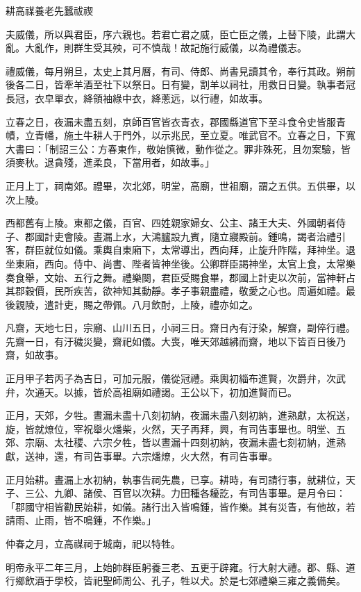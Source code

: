 
\begin{pinyinscope}
耕高禖養老先蠶祓禊

夫威儀，所以與君臣，序六親也。若君亡君之威，臣亡臣之儀，上替下陵，此謂大亂。大亂作，則群生受其殃，可不慎哉！故記施行威儀，以為禮儀志。

禮威儀，每月朔旦，太史上其月曆，有司、侍郎、尚書見讀其令，奉行其政。朔前後各二日，皆牽羊酒至社下以祭日。日有變，割羊以祠社，用救日日變。執事者冠長冠，衣皁單衣，絳領袖綠中衣，絳蔥远，以行禮，如故事。

立春之日，夜漏未盡五刻，京師百官皆衣青衣，郡國縣道官下至斗食令史皆服青幘，立青幡，施土牛耕人于門外，以示兆民，至立夏。唯武官不。立春之日，下寬大書曰：「制詔三公：方春東作，敬始慎微，動作從之。罪非殊死，且勿案驗，皆須麥秋。退貪殘，進柔良，下當用者，如故事。」

正月上丁，祠南郊。禮畢，次北郊，明堂，高廟，世祖廟，謂之五供。五供畢，以次上陵。

西都舊有上陵。東都之儀，百官、四姓親家婦女、公主、諸王大夫、外國朝者侍子、郡國計吏會陵。晝漏上水，大鴻臚設九賓，隨立寢殿前。鍾鳴，謁者治禮引客，群臣就位如儀。乘輿自東廂下，太常導出，西向拜，止旋升阼階，拜神坐。退坐東廂，西向。侍中、尚書、陛者皆神坐後。公卿群臣謁神坐，太官上食，太常樂奏食舉，文始、五行之舞。禮樂闋，君臣受賜食畢，郡國上計吏以次前，當神軒占其郡穀價，民所疾苦，欲神知其動靜。孝子事親盡禮，敬愛之心也。周遍如禮。最後親陵，遣計吏，賜之帶佩。八月飲酎，上陵，禮亦如之。

凡齋，天地七日，宗廟、山川五日，小祠三日。齋日內有汙染，解齋，副倅行禮。先齋一日，有汙穢災變，齋祀如儀。大喪，唯天郊越紼而齋，地以下皆百日後乃齋，如故事。

正月甲子若丙子為吉日，可加元服，儀從冠禮。乘輿初緇布進賢，次爵弁，次武弁，次通天。以據，皆於高祖廟如禮謁。王公以下，初加進賢而已。

正月，天郊，夕牲。晝漏未盡十八刻初納，夜漏未盡八刻初納，進熟獻，太祝送，旋，皆就燎位，宰祝舉火燔柴，火然，天子再拜，興，有司告事畢也。明堂、五郊、宗廟、太社稷、六宗夕牲，皆以晝漏十四刻初納，夜漏未盡七刻初納，進熟獻，送神，還，有司告事畢。六宗燔燎，火大然，有司告事畢。

正月始耕。晝漏上水初納，執事告祠先農，已享。耕時，有司請行事，就耕位，天子、三公、九卿、諸侯、百官以次耕。力田種各耰訖，有司告事畢。是月令曰：「郡國守相皆勸民始耕，如儀。諸行出入皆鳴鍾，皆作樂。其有災眚，有他故，若請雨、止雨，皆不鳴鍾，不作樂。」

仲春之月，立高禖祠于城南，祀以特牲。

明帝永平二年三月，上始帥群臣躬養三老、五更于辟雍。行大射大禮。郡、縣、道行鄉飲酒于學校，皆祀聖師周公、孔子，牲以犬。於是七郊禮樂三雍之義備矣。


\end{pinyinscope}
